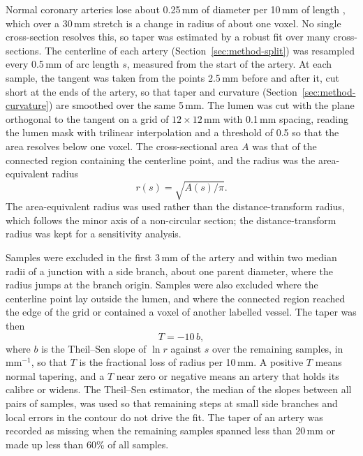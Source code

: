 Normal coronary arteries lose about 0.25\,mm of diameter per 10\,mm of length \cite{medranogracia2016atlas}, which over a 30\,mm stretch is a change in radius of about one voxel.
No single cross-section resolves this, so taper was estimated by a robust fit over many cross-sections.
The centerline of each artery (Section~\ref{sec:method-split}) was resampled every 0.5\,mm of arc length $s$, measured from the start of the artery.
At each sample, the tangent was taken from the points 2.5\,mm before and after it, cut short at the ends of the artery, so that taper and curvature (Section~\ref{sec:method-curvature}) are smoothed over the same 5\,mm.
The lumen was cut with the plane orthogonal to the tangent on a grid of $12 \times 12$\,mm with 0.1\,mm spacing, reading the lumen mask with trilinear interpolation and a threshold of 0.5 so that the area resolves below one voxel.
The cross-sectional area $A$ was that of the connected region containing the centerline point, and the radius was the area-equivalent radius
\begin{equation}
  r(s) = \sqrt{A(s)/\pi}.
  \label{eq:method-taper-radius}
\end{equation}
The area-equivalent radius was used rather than the distance-transform radius, which follows the minor axis of a non-circular section; the distance-transform radius was kept for a sensitivity analysis.

Samples were excluded in the first 3\,mm of the artery and within two median radii of a junction with a side branch, about one parent diameter, where the radius jumps at the branch origin.
Samples were also excluded where the centerline point lay outside the lumen, and where the connected region reached the edge of the grid or contained a voxel of another labelled vessel.
The taper was then
\begin{equation}
  T = -10\,b,
  \label{eq:method-taper}
\end{equation}
where $b$ is the Theil--Sen slope of $\ln r$ against $s$ over the remaining samples, in mm$^{-1}$, so that $T$ is the fractional loss of radius per 10\,mm.
A positive $T$ means normal tapering, and a $T$ near zero or negative means an artery that holds its calibre or widens.
The Theil--Sen estimator, the median of the slopes between all pairs of samples, was used so that remaining steps at small side branches and local errors in the contour do not drive the fit.
The taper of an artery was recorded as missing when the remaining samples spanned less than 20\,mm or made up less than 60\% of all samples.
